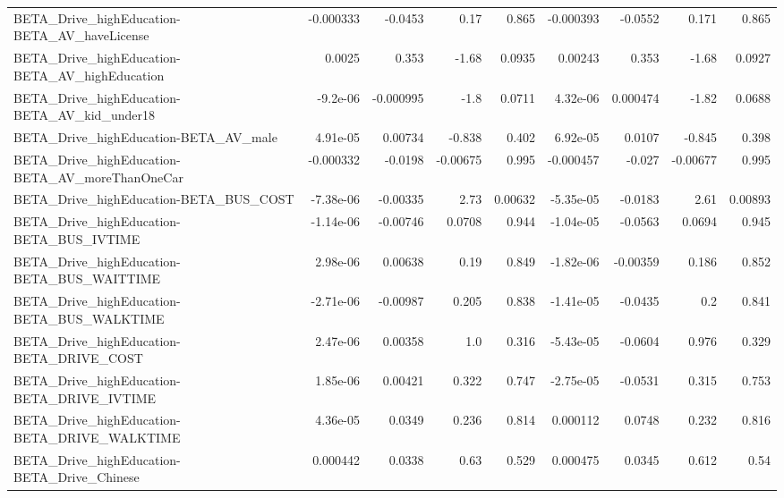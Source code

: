 \begin{tabular}{lrrrrrrrr}
BETA\_Drive\_highEducation-BETA\_AV\_haveLicense       &   -0.000333 &      -0.0453 &     0.17 &    0.865 &  -0.000393 &     -0.0552 &        0.171 &         0.865 \\
BETA\_Drive\_highEducation-BETA\_AV\_highEducation     &      0.0025 &        0.353 &    -1.68 &   0.0935 &    0.00243 &       0.353 &        -1.68 &        0.0927 \\
BETA\_Drive\_highEducation-BETA\_AV\_kid\_under18       &    -9.2e-06 &    -0.000995 &     -1.8 &   0.0711 &   4.32e-06 &    0.000474 &        -1.82 &        0.0688 \\
BETA\_Drive\_highEducation-BETA\_AV\_male              &    4.91e-05 &      0.00734 &   -0.838 &    0.402 &   6.92e-05 &      0.0107 &       -0.845 &         0.398 \\
BETA\_Drive\_highEducation-BETA\_AV\_moreThanOneCar    &   -0.000332 &      -0.0198 & -0.00675 &    0.995 &  -0.000457 &      -0.027 &     -0.00677 &         0.995 \\
BETA\_Drive\_highEducation-BETA\_BUS\_COST             &   -7.38e-06 &     -0.00335 &     2.73 &  0.00632 &  -5.35e-05 &     -0.0183 &         2.61 &       0.00893 \\
BETA\_Drive\_highEducation-BETA\_BUS\_IVTIME           &   -1.14e-06 &     -0.00746 &   0.0708 &    0.944 &  -1.04e-05 &     -0.0563 &       0.0694 &         0.945 \\
BETA\_Drive\_highEducation-BETA\_BUS\_WAITTIME         &    2.98e-06 &      0.00638 &     0.19 &    0.849 &  -1.82e-06 &    -0.00359 &        0.186 &         0.852 \\
BETA\_Drive\_highEducation-BETA\_BUS\_WALKTIME         &   -2.71e-06 &     -0.00987 &    0.205 &    0.838 &  -1.41e-05 &     -0.0435 &          0.2 &         0.841 \\
BETA\_Drive\_highEducation-BETA\_DRIVE\_COST           &    2.47e-06 &      0.00358 &      1.0 &    0.316 &  -5.43e-05 &     -0.0604 &        0.976 &         0.329 \\
BETA\_Drive\_highEducation-BETA\_DRIVE\_IVTIME         &    1.85e-06 &      0.00421 &    0.322 &    0.747 &  -2.75e-05 &     -0.0531 &        0.315 &         0.753 \\
BETA\_Drive\_highEducation-BETA\_DRIVE\_WALKTIME       &    4.36e-05 &       0.0349 &    0.236 &    0.814 &   0.000112 &      0.0748 &        0.232 &         0.816 \\
BETA\_Drive\_highEducation-BETA\_Drive\_Chinese        &    0.000442 &       0.0338 &     0.63 &    0.529 &   0.000475 &      0.0345 &        0.612 &          0.54 \\

\end{tabular}
